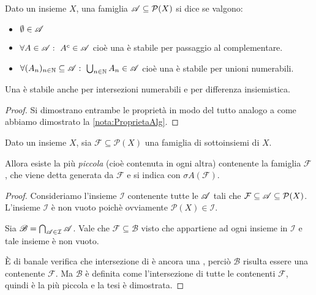\begin{definition}[\sigalg{}]
	Dato un insieme $X$, una famiglia $\mathscr A\subseteq\mathcal P(X)$ si dice \sigalg{} se valgono:
	\begin{itemize}
	\item $\emptyset\in \mathscr A$
	\item $\forall A\in \mathscr A:\ A^c\in \mathscr A$ cioè una \sigalg{} è stabile per passaggio al complementare.
	\item $\forall (A_n)_{n\in\N}\subseteq \A:\ \bigcup_{n\in\N} A_n\in \A$ cioè una \sigalg{} è stabile per unioni numerabili.  
	\end{itemize}
\end{definition}

\begin{remark}\label{nota:ProprietaSigAlg}
	Una \sigalg{} è stabile anche per intersezioni numerabili e per differenza insiemistica.
\end{remark}
\begin{proof}
	Si dimostrano entrambe le proprietà in modo del tutto analogo a come abbiamo dimostrato la \cref{nota:ProprietaAlg}.
\end{proof}

\begin{proposition}\label{prop:SigmaAlgGenerata}
	Dato un insieme $X$, sia $\mathcal F\subseteq\mathcal P(X)$ una famiglia di sottoinsiemi di $X$.
	
	Allora esiste la più \emph{piccola} (cioè contenuta in ogni altra) \sigalg{} contenente la famiglia $\mathcal F$, che viene detta \sigalg{} generata da $\mathcal F$ e si indica con $\sigma A(\mathcal F)$.
\end{proposition}
\begin{proof}
	Consideriamo l'insieme $\mathcal I$ contenente tutte le \sigalg[e] $\mathscr A$ tali che $\mathcal F\subseteq \mathscr A \subseteq \mathcal P(X)$.
	L'insieme $\mathcal I$ è non vuoto poichè ovviamente $\mathcal P(X)\in\mathcal I$.
	
	Sia $\mathscr B=\bigcap_{\mathscr A\in\mathcal I} \mathscr A$.
	Vale che $\mathcal F\subseteq \mathscr B$ visto che appartiene ad ogni insieme in $\mathcal I$ e tale insieme è non vuoto.
	
	È di banale verifica che intersezione di \sigalg[e] è ancora una \sigalg{}, perciò $\mathscr B$ risulta essere una \sigalg{} contenente $\mathcal F$. Ma $\mathscr B$ è definita come l'intersezione di tutte le \sigalg{} contenenti $\mathcal F$, quindi è la più piccola e la tesi è dimostrata.
\end{proof}



